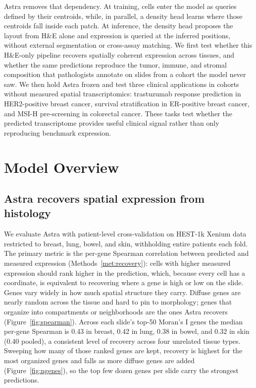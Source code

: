 \documentclass[11pt]{article}
\begin{document}
Astra removes that dependency. At training, cells enter the model as queries
defined by their centroids, while, in parallel, a density head learns where
those centroids fall inside each patch. At inference, the density head proposes the layout from
H\&E alone and expression is queried at the inferred positions, without external
segmentation or cross-assay matching. We first test whether this H\&E-only pipeline recovers spatially
coherent expression across tissues, and whether the same predictions reproduce
the tumor, immune, and stromal composition that pathologists annotate on slides
from a cohort the model never saw. We then hold Astra frozen and test three
clinical applications in cohorts without measured spatial transcriptomics:
trastuzumab response prediction in HER2-positive breast cancer, survival
stratification in ER-positive breast cancer, and MSI-H pre-screening in
colorectal cancer. These tasks test whether the predicted transcriptome provides
useful clinical signal rather than only reproducing benchmark expression.

\section{Model Overview}

\subsection{Astra recovers spatial expression from histology}
\label{sec:recovery}

We evaluate Astra with patient-level cross-validation on HEST-1k Xenium data
restricted to breast, lung, bowel, and skin, withholding entire patients each
fold. The primary metric is the per-gene Spearman correlation between predicted
and measured expression (Methods~\ref{met:recovery}): cells with higher measured expression should rank
higher in the prediction, which, because every cell has a coordinate, is
equivalent to recovering where a gene is high or low on the slide. Genes vary
widely in how much spatial structure they carry. Diffuse genes are nearly
random across the tissue and hard to pin to morphology; genes that organize into
compartments or neighborhoods are the ones Astra recovers
(Figure~\ref{fig:spearman}). Across each slide's top-50 Moran's I genes the
median per-gene Spearman is 0.43 in breast, 0.42 in lung, 0.38 in bowel, and
0.32 in skin (0.40 pooled), a consistent level of recovery across four unrelated
tissue types. Sweeping how many of those ranked genes are kept, recovery is
highest for the most organized genes and falls as more diffuse genes are added
(Figure~\ref{fig:ngenes}), so the top few dozen genes per slide carry the
strongest predictions.
\end{document}
